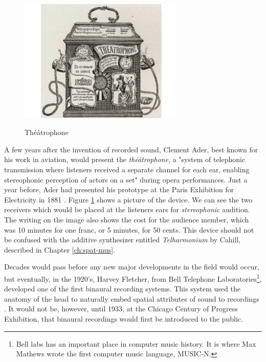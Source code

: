 \begin{figure}[ht]%
\centering
\includegraphics[width=0.7\textwidth]{img/theatrophone.jpeg} 
\label{fig:theatrophone}
\caption{Théâtrophone \cite{theatrophone_pic}}
\end{figure}

A few years after the invention of recorded sound, Clement Ader, best known for his work in  aviation, would present the \textit{théâtrophone}, a "system of telephonic transmission where listeners received a separate channel for each ear, enabling stereophonic perception of actors on a set" during opera performances. Just a year before, Ader had presented his prototype at the Paris Exhibition for Electricity in 1881 \cite{malham19953}. Figure  \ref{fig:theatrophone} shows a picture of the device. We can see the two receivers which would be placed at the listeners ears for \textit{stereophonic} audition. The writing on the image also shows the cost for the audience member, which was 10 minutes for one franc, or 5 minutes, for 50 cents. This device should not be confused with the additive synthesizer entitled \textit{Telharmonium} by Cahill, described in Chapter \ref{ch:spat-mus}. 

Decades would pass before any new major developments in the field would occur, but eventually, in the 1920's, Harvey Fletcher, from Bell Telephone Laboratories\footnote{Bell labs has an important place in computer music history. It is where Max Mathews wrote the first computer music language, MUSIC-N.}, developed one of the first binaural recording systems. This system used the anatomy of the head to naturally embed spatial attributes of sound to recordings \cite{harvey1927binaural}. It would not be, however, until 1933, at the Chicago Century of Progress Exhibition, that binaural recordings would first be introduced to the public. 

